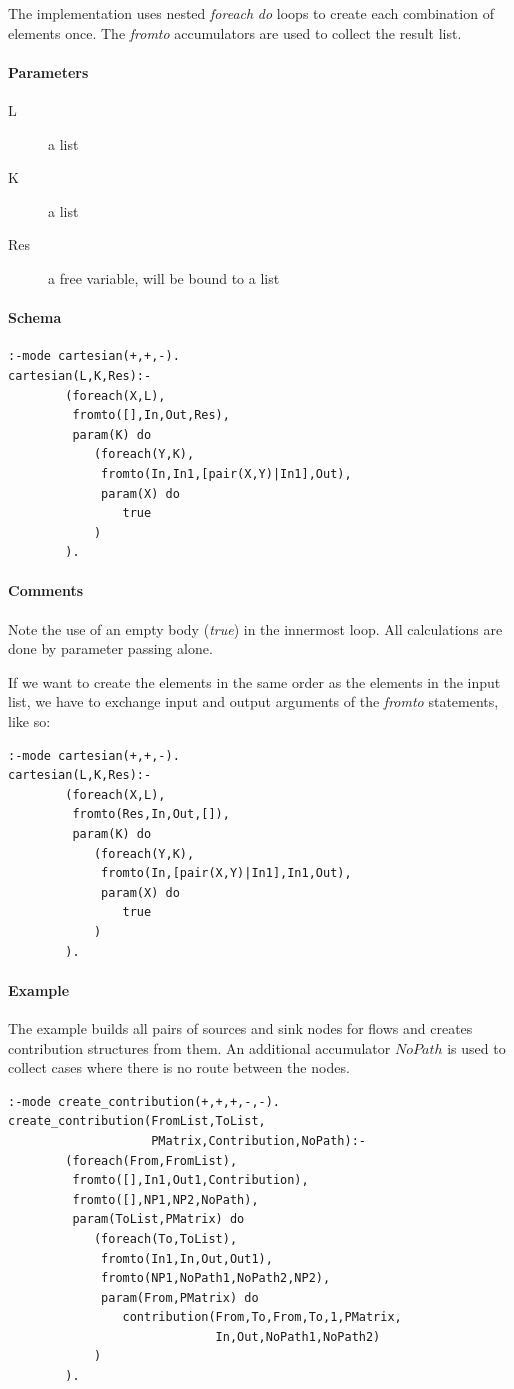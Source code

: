 \documentclass[a4paper,12pt]{report}
\begin{document}
The implementation uses nested {\it foreach} {\it do} loops to create each combination of elements once. The {\it fromto} accumulators are used to collect the result list.
\paragraph{Parameters}
\begin{description}
\item[L] a list
\item[K] a list
\item[Res] a free variable, will be bound to a list
\end{description}
\paragraph{Schema}
\begin{verbatim}
:-mode cartesian(+,+,-).
cartesian(L,K,Res):-
        (foreach(X,L),
         fromto([],In,Out,Res),
         param(K) do
            (foreach(Y,K),
             fromto(In,In1,[pair(X,Y)|In1],Out),
             param(X) do
                true
            )
        ).
\end{verbatim}
\paragraph{Comments}
Note the use of an empty body ({\it true}) in the innermost loop. All calculations are done by parameter passing alone.

If we want to create the elements in the same order as the elements in the input list, we have to exchange input and output arguments of the {\it fromto} statements, like so:
\pagebreak
\begin{verbatim}
:-mode cartesian(+,+,-).
cartesian(L,K,Res):-
        (foreach(X,L),
         fromto(Res,In,Out,[]),
         param(K) do
            (foreach(Y,K),
             fromto(In,[pair(X,Y)|In1],In1,Out),
             param(X) do
                true
            )
        ).
\end{verbatim}
\paragraph{Example}

The example builds all pairs of sources and sink nodes for flows and creates contribution structures from them. An additional accumulator $NoPath$ is used to collect cases where there is no route between the nodes.
\begin{verbatim}
:-mode create_contribution(+,+,+,-,-).
create_contribution(FromList,ToList,
                    PMatrix,Contribution,NoPath):-
        (foreach(From,FromList),
         fromto([],In1,Out1,Contribution),
         fromto([],NP1,NP2,NoPath),
         param(ToList,PMatrix) do
            (foreach(To,ToList),
             fromto(In1,In,Out,Out1),
             fromto(NP1,NoPath1,NoPath2,NP2),
             param(From,PMatrix) do
                contribution(From,To,From,To,1,PMatrix,
                             In,Out,NoPath1,NoPath2)
            )
        ).
\end{verbatim}
\end{document}

